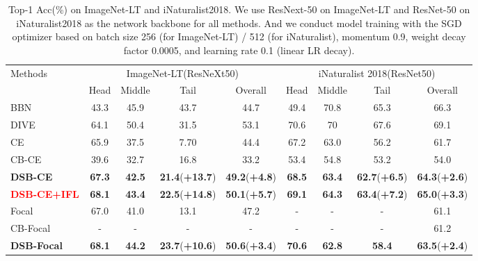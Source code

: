 \documentclass[10pt]{article} %
\begin{document}
\begin{table}[h]
\small
\renewcommand\arraystretch{1}
\vskip -0.15in
\setlength{\tabcolsep}{4.9pt} %
\caption{Top-1 Acc(\%) on ImageNet-LT and iNaturalist2018. We use ResNext-50 \cite {paper81} on ImageNet-LT and ResNet-50 \cite {paper32} on iNaturalist2018 as the network backbone for all methods. And we conduct model training with the SGD optimizer based on batch size 256 (for ImageNet-LT) / 512 (for iNaturalist), momentum 0.9, weight decay factor 0.0005, and learning rate 0.1 (linear LR decay).}
\vskip 0.05in
\label{table2}
\centering  
\begin{tabular}{l|cccc| cccc }
\hline \toprule
\multirow{2}{*}{Methods}    & \multicolumn{4}{c}{ImageNet-LT(ResNeXt50)}  & \multicolumn{4}{|c}{iNaturalist 2018(ResNet50)}  \\ \cline{2-9}
&Head   &Middle   &Tail   &Overall   &Head   &Middle   &Tail   &Overall \\  \hline
BBN \cite {paper10} &43.3 & 45.9 & 43.7 & 44.7 & 49.4  & 70.8 & 65.3 & 66.3 \\
DIVE \cite {paper74} & 64.1 & 50.4 & 31.5 & 53.1 & 70.6  & 70 & 67.6 & 69.1 \\  \hline
CE &65.9 & 37.5 & 7.70 & 44.4 & 67.2  & 63.0 & 56.2 & 61.7 \\
CB-CE \cite {paper14} &39.6 & 32.7 & 16.8 & 33.2 & 53.4  & 54.8 & 53.2 & 54.0 \\
\textbf{DSB-CE} &\textbf{67.3} & \textbf{42.5} &\textbf{21.4}(\textcolor[RGB]{0,201,87}{\textbf{+13.7}}) & \textbf{49.2}(\textcolor[RGB]{0,201,87}{\textbf{+4.8}}) & \textbf{68.5}  & \textbf{63.4} & \textbf{62.7}(\textcolor[RGB]{0,201,87}{\textbf{+6.5}}) & \textbf{64.3}(\textcolor[RGB]{0,201,87}{\textbf{+2.6}}) \\ 
\textcolor{red}{\textbf{DSB-CE+IFL}} \cite{paper115} &\textbf{68.1} & \textbf{43.4} &\textbf{22.5}(\textcolor[RGB]{0,201,87}{\textbf{+14.8}}) & \textbf{50.1}(\textcolor[RGB]{0,201,87}{\textbf{+5.7}}) & \textbf{69.1}  & \textbf{64.3} & \textbf{63.4}(\textcolor[RGB]{0,201,87}{\textbf{+7.2}}) & \textbf{65.0}(\textcolor[RGB]{0,201,87}{\textbf{+3.3}}) \\ \hline

Focal \cite {paper14} &67.0 & 41.0 & 13.1 & 47.2 & \multicolumn{1}{c}{-}  & \multicolumn{1}{c}{-} & \multicolumn{1}{c}{-} & 61.1 \\
CB-Focal \cite {paper14}  &\multicolumn{1}{c}{-}     & \multicolumn{1}{c}{-}     & \multicolumn{1}{c}{-}      & \multicolumn{1}{c|}{-}      & \multicolumn{1}{c}{-}  &\multicolumn{1}{c}{-}      &\multicolumn{1}{c}{-} & 61.2 \\
\textbf{DSB-Focal} &\textbf{68.1} & \textbf{44.2} & \textbf{23.7}(\textcolor[RGB]{0,201,87}{\textbf{+10.6}}) & \textbf{50.6}(\textcolor[RGB]{0,201,87}{\textbf{+3.4}}) & \textbf{70.6}  & \textbf{62.8} & \textbf{58.4} & \textbf{63.5}(\textcolor[RGB]{0,201,87}{\textbf{+2.4}}) \\ \hline


\end{tabular}
\end{table}
\end{document}
